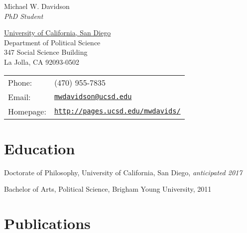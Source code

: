 \documentclass[letterpaper]{article}
\def\name{Michael W. Davidson\\
\emph{\normalsize{PhD Student}}}
\renewenvironment{itemize}{
  \begin{list}{}{
    \setlength{\leftmargin}{1.5em}
  }
}{
  \end{list}
}
\begin{document}
{\huge \name}
\vspace{.5em}


\vspace{0.5em}

\begin{minipage}{0.45\linewidth}
  \href{http://www.ucsd.edu}{University of California, San Diego} \\
  Department of Political Science \\
  347 Social Science Building \\
  La Jolla, CA 92093-0502
\end{minipage}
\begin{minipage}{0.45\linewidth}
  \begin{tabular}{ll}
    Phone: & (470) 955-7835 \\
    Email: & \href{mailto:mwdavidson@ucsd.edu}{\tt mwdavidson@ucsd.edu} \\
    Homepage: & \href{http://pages.ucsd.edu/~mwdavids/}{\tt http://pages.ucsd.edu/mwdavids/} \\
  \end{tabular}
\end{minipage}


\section*{Education}

\begin{itemize}
\item Doctorate of Philosophy, University of California, San Diego, \emph{anticipated 2017} 

  \item Bachelor of Arts, Political Science, Brigham Young University, 2011


\end{itemize}

\section*{Publications}


\end{document}
